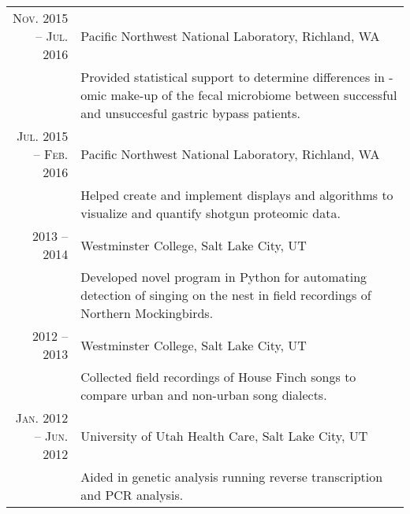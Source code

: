 \documentclass[a4paper,10pt]{article}
\begin{document}
\begin{tabular}{rp{10cm}}
	\textsc{Nov. 2015 -- Jul. 2016}  & Pacific Northwest National Laboratory, Richland, WA                                          \\
	                                 & \footnotesize{Provided statistical support to determine differences in -omic
		make-up of the fecal microbiome between successful and
	unsuccesful gastric bypass patients.}                                                                                           \\
	\textsc{Jul. 2015 -- Feb. 2016}  & Pacific Northwest National Laboratory, Richland, WA                                          \\
	                                 & \footnotesize{Helped create and implement displays and algorithms to visualize
	and quantify shotgun proteomic data.}                                                                                           \\
	\textsc{2013 -- 2014}            & Westminster College, Salt Lake City, UT                                                      \\
	                                 & \footnotesize{Developed novel program in Python for automating detection of
	singing on the nest in field recordings of Northern Mockingbirds.}                                                              \\
	\textsc{2012 -- 2013}            & Westminster College, Salt Lake City, UT                                                      \\
	                                 & \footnotesize{Collected field recordings of House Finch songs to compare urban
	and non-urban song dialects.}                                                                                                   \\
	\textsc{Jan. 2012 -- Jun. 2012}  & University of Utah Health Care, Salt Lake City, UT
	\\& \footnotesize{Aided in genetic analysis running reverse transcription and PCR analysis.}
\end{tabular}


\end{document}
